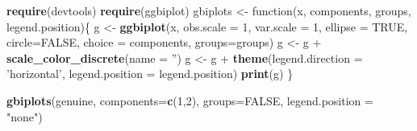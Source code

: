 \documentclass[]{article}
\newenvironment{Shaded}{\begin{snugshade}}{\end{snugshade}}
\newcommand{\KeywordTok}[1]{\textcolor[rgb]{0.13,0.29,0.53}{\textbf{{#1}}}}
\newcommand{\DataTypeTok}[1]{\textcolor[rgb]{0.13,0.29,0.53}{{#1}}}
\newcommand{\DecValTok}[1]{\textcolor[rgb]{0.00,0.00,0.81}{{#1}}}
\newcommand{\StringTok}[1]{\textcolor[rgb]{0.31,0.60,0.02}{{#1}}}
\newcommand{\OtherTok}[1]{\textcolor[rgb]{0.56,0.35,0.01}{{#1}}}
\newcommand{\NormalTok}[1]{{#1}}
\begin{document}
\begin{Shaded}
\begin{Highlighting}[]
\KeywordTok{require}\NormalTok{(devtools)}
\KeywordTok{require}\NormalTok{(ggbiplot)}
\NormalTok{gbiplots <-}\StringTok{ }\NormalTok{function(x, components, groups, legend.position)\{}
        \NormalTok{g <-}\StringTok{ }\KeywordTok{ggbiplot}\NormalTok{(x, }\DataTypeTok{obs.scale =} \DecValTok{1}\NormalTok{, }\DataTypeTok{var.scale =} \DecValTok{1}\NormalTok{, }\DataTypeTok{ellipse =} \OtherTok{TRUE}\NormalTok{, }\DataTypeTok{circle=}\OtherTok{FALSE}\NormalTok{,}
                      \DataTypeTok{choice =} \NormalTok{components, }\DataTypeTok{groups=}\NormalTok{groups)}
        \NormalTok{g <-}\StringTok{ }\NormalTok{g +}\StringTok{ }\KeywordTok{scale_color_discrete}\NormalTok{(}\DataTypeTok{name =} \StringTok{''}\NormalTok{)}
        \NormalTok{g <-}\StringTok{ }\NormalTok{g +}\StringTok{ }\KeywordTok{theme}\NormalTok{(}\DataTypeTok{legend.direction =} \StringTok{'horizontal'}\NormalTok{, }\DataTypeTok{legend.position =} \NormalTok{legend.position)}
        \KeywordTok{print}\NormalTok{(g)}
\NormalTok{\}}
\end{Highlighting}
\end{Shaded}

\begin{Shaded}
\begin{Highlighting}[]
\KeywordTok{gbiplots}\NormalTok{(genuine, }\DataTypeTok{components=}\KeywordTok{c}\NormalTok{(}\DecValTok{1}\NormalTok{,}\DecValTok{2}\NormalTok{), }\DataTypeTok{groups=}\OtherTok{FALSE}\NormalTok{, }\DataTypeTok{legend.position =} \StringTok{"none"}\NormalTok{)}
\end{Highlighting}
\end{Shaded}
\end{document}
